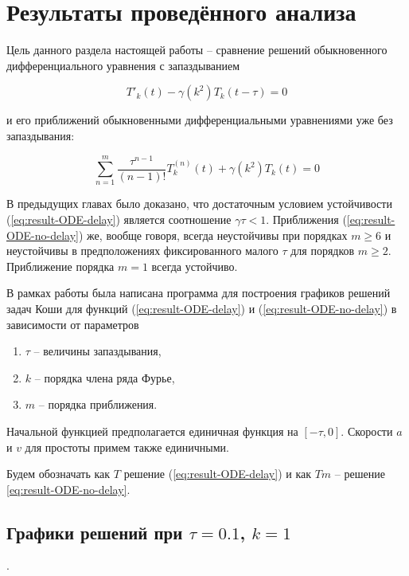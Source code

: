 \section{Результаты проведённого анализа}

Цель данного раздела настоящей работы \--- сравнение решений обыкновенного дифференциального уравнения с запаздыванием

\begin{equation}\label{eq:result-ODE-delay}
{T'}_{k}(t) - \gamma(k^2) T_k(t-\tau)=0
\end{equation}

и его приближений обыкновенными дифференциальными уравнениями уже без запаздывания:

\begin{equation}\label{eq:result-ODE-no-delay}
\sum\limits_{n=1}^{m} \dfrac{\tau^{n-1}}{(n-1)!} T_k^{(n)} (t) + \gamma(k^2) T_k (t) = 0
\end{equation}

В предыдущих главах было доказано, что достаточным условием устойчивости (\ref{eq:result-ODE-delay}) является соотношение $\gamma \tau <1$. Приближения (\ref{eq:result-ODE-no-delay}) же, вообще говоря, всегда неустойчивы при порядках $m \geq 6$ и неустойчивы в предположениях фиксированного малого $\tau$ для порядков $m \geq 2$. Приближение порядка $m=1$ всегда устойчиво.

В рамках работы была написана программа для построения графиков решений задач Коши для функций (\ref{eq:result-ODE-delay}) и (\ref{eq:result-ODE-no-delay}) в зависимости от параметров 

\begin{enumerate}
\item $\tau$ \--- величины запаздывания,
\item $k$ \--- порядка члена ряда Фурье,
\item $m$ \--- порядка приближения.
\end{enumerate}

Начальной функцией предполагается единичная функция на $[-\tau,0]$. Скорости $a$ и $v$ для простоты примем также единичными.

Будем обозначать как $T$ \- решение (\ref{eq:result-ODE-delay}) и как $Tm$ \--- решение \ref{eq:result-ODE-no-delay}.

\newpage

\subsection{Графики решений при $\tau=0.1$, $k=1$}.

